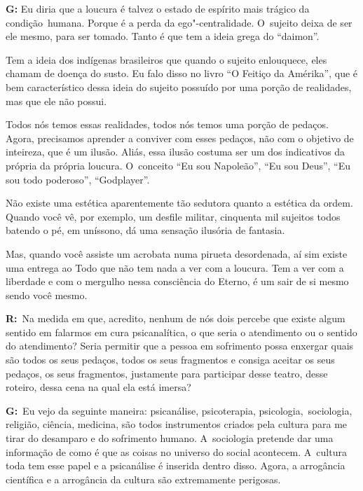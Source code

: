  

\textbf{G:} Eu diria que a loucura é talvez o estado de espírito mais
trágico da condição\textbf{}~humana. Porque é a perda da
ego"-centralidade. O~sujeito deixa de ser ele mesmo, para ser tomado.
Tanto é que tem a ideia grega do ``daimon''.

 

Tem a ideia dos indígenas brasileiros que quando o sujeito enlouquece,
eles chamam de doença do susto. Eu falo disso no livro ``O Feitiço da
Amérika'', que é bem característico dessa ideia do sujeito possuído
por uma porção de realidades, mas que ele não possui.

 

Todos nós temos essas realidades, todos nós temos uma porção de pedaços.
Agora, precisamos aprender a conviver com esses pedaços, não com o
objetivo de inteireza, que é um ilusão. Aliás, essa ilusão costuma ser
um dos indicativos da própria da própria loucura. O~conceito ``Eu sou
Napoleão'', ``Eu sou Deus'', ``Eu sou todo poderoso'', ``Godplayer''.

 

Não existe uma estética aparentemente tão sedutora quanto a estética da
ordem. Quando você vê, por exemplo, um desfile militar, cinquenta mil
sujeitos todos batendo o pé, em uníssono, dá uma sensação ilusória de
fantasia.

 

Mas, quando você assiste um acrobata numa pirueta desordenada, aí sim
existe uma entrega ao Todo que não tem nada a ver com a loucura. Tem a
ver com a liberdade e com o mergulho nessa consciência do Eterno, é um
sair de si mesmo sendo você mesmo.

 

\textbf{R:}~Na medida em que, acredito, nenhum de nós dois percebe que
existe algum sentido em falarmos em cura psicanalítica, o que seria o
atendimento ou o sentido do atendimento? Seria permitir que a pessoa em
sofrimento possa enxergar quais são todos os seus pedaços, todos os seus
fragmentos e consiga aceitar os seus pedaços, os seus fragmentos,
justamente para participar desse teatro, desse roteiro, dessa cena na
qual ela está imersa?

 

\textbf{G:}~Eu vejo da seguinte maneira: psicanálise, psicoterapia,
psicologia,\textbf{}~sociologia, religião, ciência, medicina, são todos
instrumentos criados pela cultura para me tirar do desamparo e do
sofrimento humano. A~sociologia pretende dar uma informação de como é
que as coisas no universo do social acontecem. A~cultura toda tem esse
papel e a psicanálise é inserida dentro disso. Agora, a arrogância
científica e a arrogância da cultura são extremamente perigosas.

